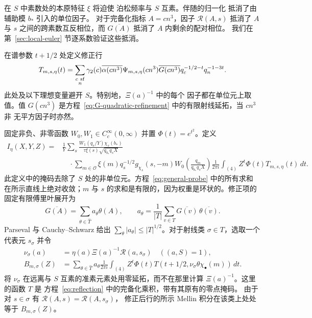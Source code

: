 \documentclass[11pt,a4paper]{article}
\numberwithin{equation}{section}
\numberwithin{figure}{section}
\theoremstyle{definition}
\theoremstyle{remark}
\begin{document}
在 $S$ 中素数处的本原特征 $\xi$ 将迫使
泊松频率与 $S$ 互素。伴随的归一化
抵消了由辅助模 $b_*$ 引入的单位因子。
对于完备化指标 $A=cn^3$，因子 $\mathcal R(A,s)$
抵消了 $A$ 与 $s$ 之间的跨素数互反相位，而
$\overline{G(A)}$ 抵消了 $A$ 内剩余的配对相位。
我们在第~\ref{sec:local-euler} 节逐系数验证这些抵消。

在谱参数 $t+1/2$ 处定义修正行
\[
 T_{m,s,\eta}(t)=
 \sum_{\substack{c\ {\rm sf}\\n}}
 \gamma_2(c)\overline{\alpha(cn^3)}\Psi_{m,s,\eta}(cn^3)
 \overline{G(cn^3)}q_c^{-1/2-t}q_n^{-1-3t}.
\]
此处及以下理想变量避开 $S$。特别地，$\Xi(a)^{-1}$ 中的每个
因子都在单位元上取值。值
$G(cn^3)$ 是方程~\eqref{eq:G-quadratic-refinement} 中的有限射线延拓，当 $cn^3$ 非
无平方因子时亦然。

固定非负、非零函数 $W_0,W_1\in C_c^\infty(0,\infty)$
并置 $\Phi(t)=e^{t^2}$。定义
\begin{equation}\label{eq:general-probe}
\begin{aligned}
 I_\eta(X,Y,Z)={}&\frac1Y\sum_s
 \frac{W_1(q_s/Y)\chi_s(b_*)}
      {\tau\xi(s)\sqrt{q_{b_*}q_sX}}\\
 &\quad\cdot\sum_{m\in\mathcal O}
       \xi(m)q_s^{-1/2}g_{\chi_s}(s,-m)
       W_0\!\left(\frac{q_m}{q_{b_*}q_sX}\right)
       \frac1{2\pi i}\int_{(4)}
             Z^t\Phi(t)T_{m,s,\eta}(t)\,dt.
\end{aligned}
\end{equation}
此定义中的掩码去除了 $S$ 处的非单位元。方程~\eqref{eq:general-probe} 中的所有求和
在所示直线上绝对收敛；$m$ 与 $s$ 的求和是有限的，因为权重是环状的。修正项的固定有限傅里叶展开为
\[
 \overline{G(A)}=\sum_{\theta\in\widehat T}a_\theta\theta(A),
 \qquad
 a_\theta=\frac1{|T|}\sum_{v\in T}
                 \overline{G(v)}\,\overline{\theta(v)}.
\]
Parseval 与 Cauchy--Schwarz 给出
$\sum_\theta|a_\theta|\le |T|^{1/2}$。对于射线类
$\sigma\in T$，选取一个代表元 $s_\sigma$ 并令
\[
 \begin{aligned}
 \nu_\sigma(a)&=\eta(a)\Xi(a)^{-1}\mathcal R(a,s_\sigma)
       \quad ((a,S)=1),\\
 B_{m,\sigma}(Z)&=\sum_{\theta\in\widehat T}a_\theta
 \frac1{2\pi i}\int_{(4)}Z^t\Phi(t)
       T(t+1/2,\nu_\sigma\theta\chi_\bullet(m))\,dt.
 \end{aligned}
\]
将 $\nu_\sigma$ 在远离与 $S$ 互素的准素元素处用零延拓，而不在那里计算
$\Xi(a)^{-1}$。这里的函数 $T$ 是
方程~\eqref{eq:reflection} 中的完备化乘积，带有其原有的零点掩码。
由于对 $s\in\sigma$ 有 $\mathcal R(A,s)=\mathcal R(A,s_\sigma)$，
修正后行的所示 Mellin 积分在该类上处处等于
$B_{m,\sigma}(Z)$。
\end{document}
